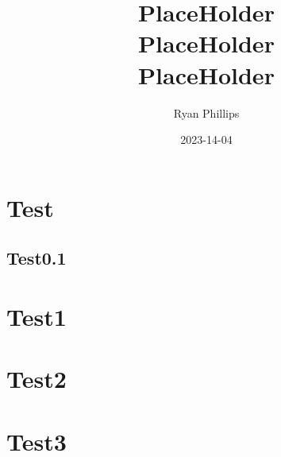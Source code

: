 \documentclass[UTF8, oneside]{book}
\begin{document}
\newpage
  \title{%
    PlaceHolder \\
    \large PlaceHolder \\
      PlaceHolder}

  \date{2023-14-04}
  \author{Ryan Phillips}
  \maketitle
\clearpage

\newpage
  \tableofcontents

  \section{Test} 
    \subsection{Test0.1}

  \section{Test1}

  \section{Test2}

  \section{Test3}
\clearpage
\end{document}

